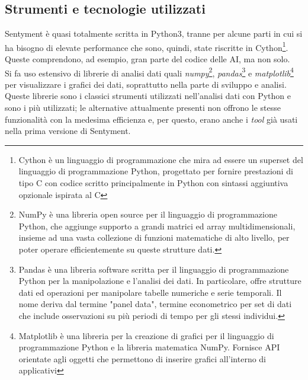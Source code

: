 \documentclass[a4paper,12pt]{report}
\begin{document}
\subsection{Strumenti e tecnologie utilizzati}
Sentyment è quasi totalmente scritta in Python3, tranne per alcune parti in cui si ha bisogno di elevate performance che sono, quindi, state riscritte in Cython\footnote{Cython è un linguaggio di programmazione che mira ad essere un superset del linguaggio di programmazione Python, progettato per fornire prestazioni di tipo C con codice scritto principalmente in Python con sintassi aggiuntiva opzionale ispirata al C}. Queste comprendono, ad esempio, gran parte del codice delle AI, ma non solo.\\
Si fa uso estensivo di librerie di analisi dati quali \textit{numpy}\footnote{NumPy è una libreria open source per il linguaggio di programmazione Python, che aggiunge supporto a grandi matrici ed array multidimensionali, insieme ad una vasta collezione di funzioni matematiche di alto livello, per poter operare efficientemente su queste strutture dati.}, \textit{pandas}\footnote{Pandas è una libreria software scritta per il linguaggio di programmazione Python per la manipolazione e l'analisi dei dati. In particolare, offre strutture dati ed operazioni per manipolare tabelle numeriche e serie temporali. Il nome deriva dal termine "panel data", termine econometrico per set di dati che include osservazioni su più periodi di tempo per gli stessi individui.} e \textit{matplotlib}\footnote{Matplotlib è una libreria per la creazione di grafici per il linguaggio di programmazione Python e la libreria matematica NumPy. Fornisce API orientate agli oggetti che permettono di inserire grafici all'interno di applicativi} per visualizzare i grafici dei dati, soprattutto nella parte di sviluppo e analisi.\\
Queste librerie sono i classici strumenti utilizzati nell'analisi dati con Python e sono i più utilizzati; le alternative attualmente presenti non offrono le stesse funzionalità con la medesima efficienza e, per questo, erano anche i \textit{tool} già usati nella prima versione di Sentyment.\\
\end{document}
